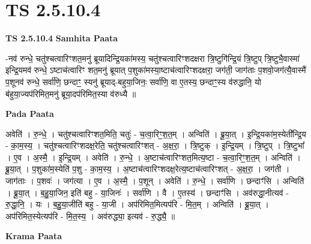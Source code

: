 \documentclass[17pt]{extarticle}
\begin{document}
\section{ TS 2.5.10.4 }

\textbf{TS 2.5.10.4 } \newline
\textbf{Samhita Paata} \newline

-नव॑ रुन्धे॒ चतु॑श्चत्वारिꣳशत॒मनु॑ ब्रूयादिन्द्रि॒यका॑मस्य॒ चतु॑श्चत्वारिꣳशदक्षरा त्रि॒ष्टुगि॑न्द्रि॒यं त्रि॒ष्टुप् त्रि॒ष्टुभै॒वास्मा॑ इन्द्रि॒यमव॑ रुन्धे॒ ऽष्टाच॑त्वारिꣳ शत॒मनु॑ ब्रूयात् प॒शुका॑मस्या॒ष्टाच॑त्वारिꣳशदक्षरा॒ जग॑ती॒ जाग॑ताः प॒शवो॒जग॑त्यै॒वास्मै॑ प॒शूनव॑ रुन्धे॒ सर्वा॑णि॒ छन्दाꣳ॒॒ स्यनु॑ ब्रूयाद्-बहुया॒जिनः॒ सर्वा॑णि॒ वा ए॒तस्य॒ छन्दाꣳ॒॒स्य व॑रुद्धानि॒ यो ब॑हुया॒ज्यप॑रिमित॒मनु॑ ब्रूया॒दप॑रिमित॒स्या व॑रुध्यै ॥ \newline

\textbf{Pada Paata} \newline

अवेति॑ । रु॒न्धे॒ । चतु॑श्चत्वारिꣳशत॒मिति॒ चतुः॑ - च॒त्वा॒रिꣳ॒॒श॒त॒म् । अन्विति॑ । ब्रू॒या॒त् । इ॒न्द्रि॒यका॑म॒स्येती᳚न्द्रि॒य - का॒म॒स्य॒ । चतु॑श्चत्वारिꣳशदक्ष॒रेति॒ चतु॑श्चत्वारिꣳशत् - अ॒क्ष॒रा॒ । त्रि॒ष्टुक् । इ॒न्द्रि॒यम् । त्रि॒ष्टुप् । त्रि॒ष्टुभा᳚ । ए॒व । अ॒स्मै॒ । इ॒न्द्रि॒यम् । अवेति॑ । रु॒न्धे॒ । अ॒ष्टाच॑त्वारिꣳशत॒मित्य॒ष्टा - च॒त्वा॒रिꣳ॒॒श॒त॒म् । अन्विति॑ । ब्रू॒या॒त् । प॒शुका॑म॒स्येति॑ प॒शु - का॒म॒स्य॒ । अ॒ष्टाच॑त्वारिꣳशदक्ष॒रेत्य॒ष्टाच॑त्वारिꣳशत् - अ॒क्ष॒रा॒ । जग॑ती । जाग॑ताः । प॒शवः॑ । जग॑त्या । ए॒व । अ॒स्मै॒ । प॒शून् । अवेति॑ । रु॒न्धे॒ । सर्वा॑णि । छन्दाꣳ॑सि । अन्विति॑ । ब्रू॒या॒त् । ब॒हु॒या॒जिन॒ इति॑ बहु - या॒जिनः॑ । सर्वा॑णि । वै । ए॒तस्य॑ । छन्दाꣳ॑सि । अव॑रुद्धा॒नीत्यव॑ - रु॒द्धा॒नि॒ । यः । ब॒हु॒या॒जीति॑ बहु - या॒जी । अप॑रिमित॒मित्यप॑रि - मि॒त॒म् । अन्विति॑ । ब्रू॒या॒त् । अप॑रिमित॒स्येत्यप॑रि - मि॒त॒स्य॒ । अव॑रुद्ध्या॒ इत्यव॑ - रु॒द्ध्यै॒ ॥  \newline


\textbf{Krama Paata} \newline
\end{document}
